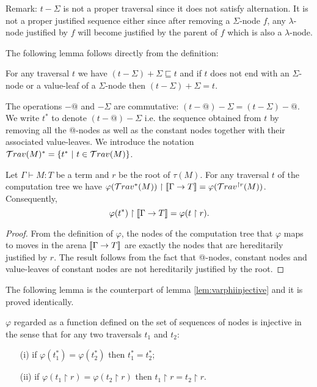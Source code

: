 Remark: $t-\Sigma$ is not a proper traversal since it does not
satisfy alternation. It is not a proper justified sequence either
since after removing a $\Sigma$-node $f$, any $\lambda$-node
justified by $f$ will become justified by the parent of $f$ which is
also a $\lambda$-node.

The following lemma follows directly from the definition:
\begin{lem}
\label{lem:minus_sig_plus_sig} For any traversal $t$ we have
$(t-\Sigma)+\Sigma \sqsubseteq t$ and if $t$ does not end with an
$\Sigma$-node or a value-leaf of a $\Sigma$-node then
$(t-\Sigma)+\Sigma = t$.
\end{lem}

The operations $-@$ and $-\Sigma$ are commutative: $(t-@)-\Sigma =
(t-\Sigma)-@$. We write $t^*$ to denote $(t-@)-\Sigma$ i.e. the
sequence obtained from $t$ by removing all the @-nodes as well as
the constant nodes together with their associated value-leaves. We
introduce the notation $\mathcal{T}rav(M)^{*} = \{ t^* \ | \  t \in
\mathcal{T}rav(M) \}$.

\begin{lem}
\label{lem:SIGMACONST:varphi_filter} Let $\Gamma \vdash M :T$ be a
term and $r$ be the root of $\tau(M)$. For any traversal $t$ of the
computation tree we have $ \varphi(\mathcal{T}rav^*(M)) \upharpoonright
{[\![\Gamma \rightarrow T ]\!]} = \varphi(\mathcal{T}rav^{\upharpoonright
r}(M)) $.
 Consequently,
$$\varphi(t^*) \upharpoonright {[\![\Gamma \rightarrow T ]\!]} = \varphi(t\upharpoonright r).$$
\end{lem}
\begin{proof}
    From the definition of $\varphi$, the nodes of the computation tree that $\varphi$ maps
    to moves in the arena ${[\![ \Gamma \rightarrow T ]\!]}$ are exactly the nodes that are hereditarily justified by $r$.
    The result follows from the fact that @-nodes, constant nodes and value-leaves of constant nodes
    are not hereditarily justified by the root.
\end{proof}

The following lemma is the counterpart of lemma
\ref{lem:varphiinjective} and it is proved identically.
\begin{lem}
\label{lem:SIGMACONST:varphiinjective} $\varphi$ regarded as a
function defined on the set of sequences of nodes is injective in
the sense that for any two traversals $t_1$ and $t_2$:
\begin{itemize}
\item[(i)] if $\varphi (t_1^* ) = \varphi (t_2^* )$ then $t_1^* =t_2^*$;
\item[(ii)] if $\varphi (t_1 \upharpoonright r ) = \varphi (t_2 \upharpoonright r )$ then $t_1\upharpoonright r = t_2\upharpoonright r$.
\end{itemize}
\end{lem}

